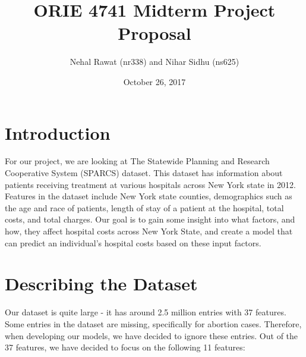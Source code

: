 \documentclass{article}
\title{ORIE 4741 Midterm Project Proposal}
\author{Nehal Rawat (nr338) and Nihar Sidhu (ns625) }
\date{October 26, 2017}
\begin{document}
\maketitle

\section{Introduction}
For our project, we are looking at The Statewide Planning and Research Cooperative System (SPARCS) dataset. This dataset has information about patients receiving treatment at various hospitals across New York state in 2012. Features in the dataset include New York state counties, demographics such as the age and race of patients, length of stay of a patient at the hospital, total costs, and total charges. Our goal is to gain some insight into what factors, and how, they affect hospital costs across New York State, and create a model that can predict an individual’s hospital costs based on these input factors. 

\section{Describing the Dataset}
Our dataset is quite large - it has around 2.5 million entries with 37 features. Some entries in the dataset are missing, specifically for abortion cases. Therefore, when developing our models, we have decided to ignore these entries. Out of the 37 features, we have decided to focus on the following 11 features: 
\end{document}
